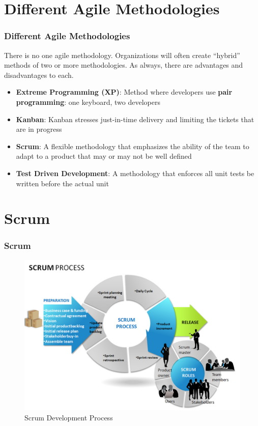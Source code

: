 \documentclass[aspectratio=169]{beamer}
\begin{document}
\section{Different Agile Methodologies}
\begin{frame}
\frametitle{Different Agile Methodologies}
There is no one agile methodology. Organizations will often create ``hybrid'' methods of two or more methodologies. As always, there are advantages and disadvantages to each.
\begin{itemize}
	\item \textbf{Extreme Programming (XP)}: Method where developers use \textbf{pair programming}: one keyboard, two developers
	\item \textbf{Kanban}: Kanban stresses just-in-time delivery and limiting the tickets that are in progress
	\item \textbf{Scrum}: A flexible methodology that emphasizes the ability of the team to adapt to a product that may or may not be well defined
	\item \textbf{Test Driven Development}: A methodology that enforces all unit tests be written before the actual unit
\end{itemize}
\end{frame}

\section{Scrum}
\begin{frame}
\frametitle{Scrum}
\begin{figure}
\includegraphics[scale=0.25]{../artifacts/scrum.jpg}
\caption{Scrum Development Process}
\label{fig:scrum}
\end{figure}
\end{frame}
\end{document}
